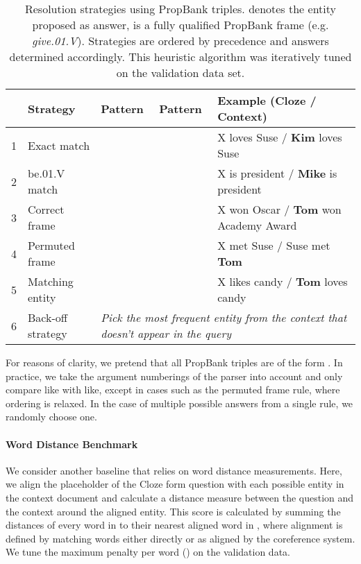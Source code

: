 \documentclass{article}
\begin{document}
\begin{table}[h]\footnotesize
  \centering
  \begin{tabular}{@{}rllll@{}}
    \toprule
    & Strategy & Pattern  & Pattern  & Example (Cloze / Context) \\
    \midrule
    1 & Exact match &  &  & X loves Suse / \textbf{Kim} loves Suse \\
    2 & be.01.V match &  &  & X is president / \textbf{Mike} is president \\
    3 & Correct frame &  &  & X won Oscar / \textbf{Tom} won Academy Award \\
    4 & Permuted frame &  &  & X met Suse / Suse met \textbf{Tom} \\
    5 & Matching entity &  &  & X likes candy / \textbf{Tom} loves candy \\
    6 & Back-off strategy & \multicolumn{3}{l}{\textit{Pick the most frequent entity from the context that doesn't appear in the query}} \\
    \bottomrule
  \end{tabular}
  \caption{Resolution strategies using PropBank triples.  denotes the
    entity proposed as answer,  is a fully qualified PropBank frame (e.g.
    \textit{give.01.V}). Strategies are ordered by precedence and answers
    determined accordingly. This heuristic algorithm was iteratively
    tuned on the validation data set.
    \label{tab:fsp}
  }
\end{table}

For reasons of clarity, we pretend that all PropBank triples are of the form
. In practice, we take the argument numberings of the parser into
account and only compare like with like, except in cases such as the permuted
frame rule, where ordering is relaxed. In the case of multiple possible answers
from a single rule, we randomly choose one.

\paragraph{Word Distance Benchmark}

We consider another baseline that relies on word distance measurements. Here, we
align the placeholder of the Cloze form question with each possible entity in
the context document and calculate a distance measure between the question and the
context around the aligned entity.
This score is calculated by summing the distances of every word in 
to their nearest aligned word in , where alignment is defined by matching
words either directly or as aligned by the coreference system. We tune the
maximum penalty per word () on the validation data.
\end{document}
